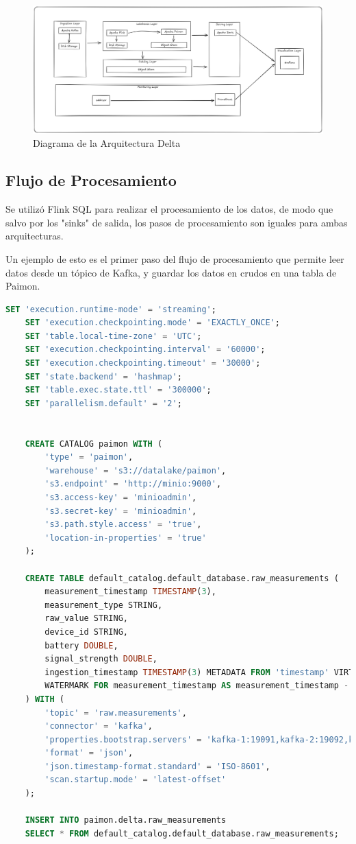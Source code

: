 \begin{figure}[h]
\centering
\includegraphics[width=1\textwidth]{desarrollo/Delta.png}
\caption{Diagrama de la Arquitectura Delta}
\label{fig:des_arquitectura_delta}
\end{figure}

\subsection{Flujo de Procesamiento}

Se utilizó Flink SQL para realizar el procesamiento de los datos, de modo que salvo por los "sinks" de salida,
los pasos de procesamiento son iguales para ambas arquitecturas.

Un ejemplo de esto es el primer paso del flujo de procesamiento que permite leer datos desde un tópico de Kafka,
y guardar los datos en crudos en una tabla de Paimon.
\begin{lstlisting}[language=sql]
    SET 'execution.runtime-mode' = 'streaming';
    SET 'execution.checkpointing.mode' = 'EXACTLY_ONCE';
    SET 'table.local-time-zone' = 'UTC';
    SET 'execution.checkpointing.interval' = '60000';
    SET 'execution.checkpointing.timeout' = '30000';
    SET 'state.backend' = 'hashmap';
    SET 'table.exec.state.ttl' = '300000';
    SET 'parallelism.default' = '2';


    CREATE CATALOG paimon WITH (
        'type' = 'paimon',
        'warehouse' = 's3://datalake/paimon',
        's3.endpoint' = 'http://minio:9000',
        's3.access-key' = 'minioadmin',  
        's3.secret-key' = 'minioadmin',
        's3.path.style.access' = 'true',
        'location-in-properties' = 'true'
    );

    CREATE TABLE default_catalog.default_database.raw_measurements (
        measurement_timestamp TIMESTAMP(3),
        measurement_type STRING,
        raw_value STRING,
        device_id STRING,
        battery DOUBLE,
        signal_strength DOUBLE,
        ingestion_timestamp TIMESTAMP(3) METADATA FROM 'timestamp' VIRTUAL,
        WATERMARK FOR measurement_timestamp AS measurement_timestamp - INTERVAL '10' SECONDS
    ) WITH (
        'topic' = 'raw.measurements',
        'connector' = 'kafka',
        'properties.bootstrap.servers' = 'kafka-1:19091,kafka-2:19092,kafka-3:19093',
        'format' = 'json',
        'json.timestamp-format.standard' = 'ISO-8601',
        'scan.startup.mode' = 'latest-offset'
    );

    INSERT INTO paimon.delta.raw_measurements
    SELECT * FROM default_catalog.default_database.raw_measurements;
\end{lstlisting}

